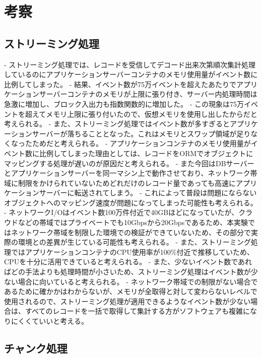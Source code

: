 \documentclass[../../main]{subfiles}
\begin{document}
    \section{考察}\label{sec:consideration}

    \subsection{ストリーミング処理}\label{subsec:consideration-streaming}

    - ストリーミング処理では、レコードを受信してデコード出来次第順次集計処理しているのにアプリケーションサーバーコンテナのメモリ使用量がイベント数に比例してしまった。
    - 結果、イベント数が75万イベントを超えたあたりでアプリケーションサーバーコンテナのメモリが上限に張り付き、サーバー内処理時間は急激に増加し、ブロック入出力も指数関数的に増加した。
    - この現象は75万イベントを超えてメモリ上限に張り付いたので、仮想メモリを使用し出したからだと考えられる。
    - また、ストリーミング処理ではイベント数が多すぎるとアプリケーションサーバーが落ちることとなった。これはメモリとスワップ領域が足りなくなったためだと考えられる。
    - アプリケーションコンテナのメモリ使用量がイベント数に比例してしまった理由としては、レコードをORMでオブジェクトにマッピングする処理が遅いのが原因だと考えられる。
    - また今回はDBサーバーとアプリケーションサーバーを同一マシン上で動作させており、ネットワーク帯域に制限をかけられていないためどれだけのレコード量であっても高速にアプリケーションサーバーに転送されてしまう。
    - これによって普段は問題にならないオブジェクトへのマッピング速度が問題になってしまった可能性も考えられる。
    - ネットワークI/Oはイベント数100万件付近で40GBほどになっていたが、クラウドなどの帯域ではプライベートでも10Gbpsから20Gbpsであるため、本実験ではネットワーク帯域を制限した環境での検証ができていないため、その部分で実際の環境との差異が生じている可能性も考えられる。
    - また、ストリーミング処理ではアプリケーションコンテナのCPU使用率が100\%付近で推移していため、CPUを十分に活用できていると考えられる。
    - また、少ないイベント数であればどの手法よりも処理時間が小さいため、ストリーミング処理はイベント数が少ない場合に向いていると考えられる。
    - ネットワーク帯域での制限がない場合であるために確かかはわからないが、メモリが全取得と対して変わらないレベルで使用されるので、ストリーミング処理が適用できるようなイベント数が少ない場合は、すべてのレコードを一括で取得して集計する方がソフトウェアも複雑になりにくくていいと考える。

    \subsection{チャンク処理}\label{subsec:consideration-chunk}
\end{document}
